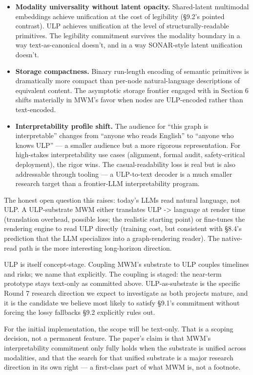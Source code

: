 \documentclass[12pt]{article}
\providecommand{\tightlist}{%
  \setlength{\itemsep}{0pt}\setlength{\parskip}{0pt}}
\begin{document}
\begin{itemize}
\tightlist
\item
  \textbf{Modality universality without latent opacity.} Shared-latent multimodal embeddings achieve unification at the cost of legibility (§9.2's pointed contrast). ULP achieves unification at the level of structurally-readable primitives. The legibility commitment survives the modality boundary in a way text-as-canonical doesn't, and in a way SONAR-style latent unification doesn't.
\item
  \textbf{Storage compactness.} Binary run-length encoding of semantic primitives is dramatically more compact than per-node natural-language descriptions of equivalent content. The asymptotic storage frontier engaged with in Section 6 shifts materially in MWM's favor when nodes are ULP-encoded rather than text-encoded.
\item
  \textbf{Interpretability profile shift.} The audience for ``this graph is interpretable'' changes from ``anyone who reads English'' to ``anyone who knows ULP'' --- a smaller audience but a more rigorous representation. For high-stakes interpretability use cases (alignment, formal audit, safety-critical deployment), the rigor wins. The casual-readability loss is real but is also addressable through tooling --- a ULP-to-text decoder is a much smaller research target than a frontier-LLM interpretability program.
\end{itemize}

The honest open question this raises: today's LLMs read natural language, not ULP. A ULP-substrate MWM either translates ULP -\textgreater{} language at render time (translation overhead, possible loss; the realistic starting point) or fine-tunes the rendering engine to read ULP directly (training cost, but consistent with §8.4's prediction that the LLM specializes into a graph-rendering reader). The native-read path is the more interesting long-horizon direction.

ULP is itself concept-stage. Coupling MWM's substrate to ULP couples timelines and risks; we name that explicitly. The coupling is staged: the near-term prototype stays text-only as committed above. ULP-as-substrate is the specific Round 7 research direction we expect to investigate as both projects mature, and it is the candidate we believe most likely to satisfy §9.1's commitment without forcing the lossy fallbacks §9.2 explicitly rules out.

For the initial implementation, the scope will be text-only. That is a scoping decision, not a permanent feature. The paper's claim is that MWM's interpretability commitment only fully holds when the substrate is unified across modalities, and that the search for that unified substrate is a major research direction in its own right --- a first-class part of what MWM is, not a footnote.
\end{document}

